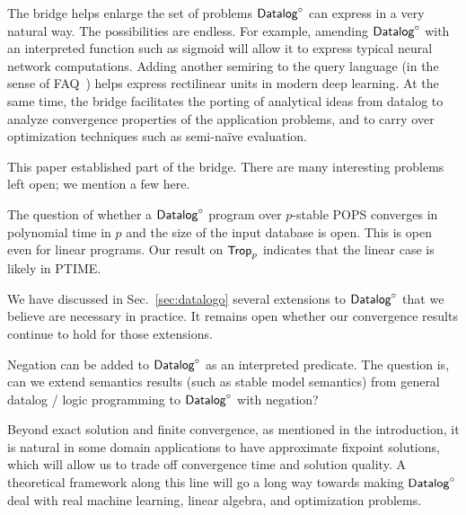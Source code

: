 The bridge helps enlarge the set of problems $\text{\sf Datalog}^\circ$ can express in a
very natural way.  The possibilities are endless. For example,
amending $\text{\sf Datalog}^\circ$ with an interpreted function such as {\sf sigmoid}
will allow it to express typical neural network computations.  Adding
another semiring to the query language (in the sense of
FAQ~\cite{DBLP:conf/pods/KhamisNR16}) helps express rectilinear units
in modern deep learning.  At the same time, the bridge facilitates the
porting of analytical ideas from datalog to analyze convergence
properties of the application problems, and to carry over optimization
techniques such as semi-na\"ive evaluation.

This paper established part of the bridge. There are many interesting problems left
open; we mention a few here.

The question of whether a $\text{\sf Datalog}^\circ$ program over $p$-stable POPS
converges in polynomial time in $p$ and the size of the input database
is open. This is open even for linear programs.  Our result on
$\text{\sf Trop}_p$ indicates that the linear case
is likely in PTIME.

We have discussed in Sec.~\ref{sec:datalogo} several extensions to
$\text{\sf Datalog}^\circ$ that we believe are necessary in practice.  It remains open
whether our convergence results continue to hold for those extensions.

Negation can be added to $\text{\sf Datalog}^\circ$ as an interpreted predicate.  The
question is, can we extend semantics results (such as stable model
semantics) from general datalog / logic programming to $\text{\sf Datalog}^\circ$ with
negation?  

Beyond exact solution and finite convergence, as mentioned in the
introduction, it is natural in some domain applications to have
approximate fixpoint solutions, which will allow us to trade off
convergence time and solution quality. A theoretical framework along
this line will go a long way towards making $\text{\sf Datalog}^\circ$ deal with real
machine learning, linear algebra, and optimization problems.

